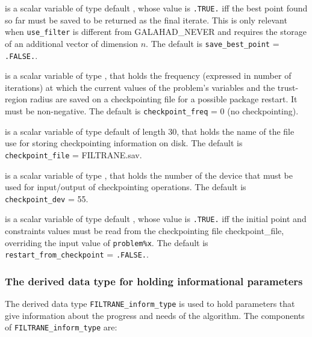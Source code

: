 \documentclass{galahad}
\newcommand{\packagename}{FILTRANE}
\newcommand{\sym}{\sf\small}
\begin{document}
\begin{description}
 is a scalar variable of type default \logical, 
whose value is {\tt .TRUE.} iff the best point found so far must be saved to be
returned as the final iterate.  This is only relevant when
{\tt use\_filter} is different from {\sym GALAHAD\_NEVER}
and requires the storage of an additional vector of dimension $n$.
The default is {\tt save\_best\_point} = {\tt .FALSE.}.

 is a scalar variable of type \integer, that
holds the frequency (expressed in number of iterations) at which
the current values of the problem's variables and the trust-region radius are
saved on a checkpointing file for a possible package restart. It must be
non-negative. 
The default is {\tt checkpoint\_freq} = 0 (no checkpointing).

 is a scalar variable of type default \character of
length 30, that holds the name of the file use for storing checkpointing 
information on disk.
The default is {\tt checkpoint\_file} = FILTRANE.sav.

 is a scalar variable of type \integer, that
holds the number of the device that must be used for input/output of
checkpointing operations.
The default is {\tt checkpoint\_dev} = 55.

 is a scalar variable of type default \logical,
whose value is {\tt .TRUE.} iff the initial point and constraints values must
be read from the checkpointing file checkpoint\_file,
overriding the input value of {\tt problem\%x}.
The default is {\tt restart\_from\_checkpoint} = {\tt .FALSE.}.

\end{description}


\subsubsection{The derived data type for holding informational
parameters}\label{typeinform}
The derived data type 
{\tt \packagename\_inform\_type} 
is used to hold parameters that give information about the progress and needs 
of the algorithm. The components of 
{\tt \packagename\_inform\_type} 
are:
\end{document}
